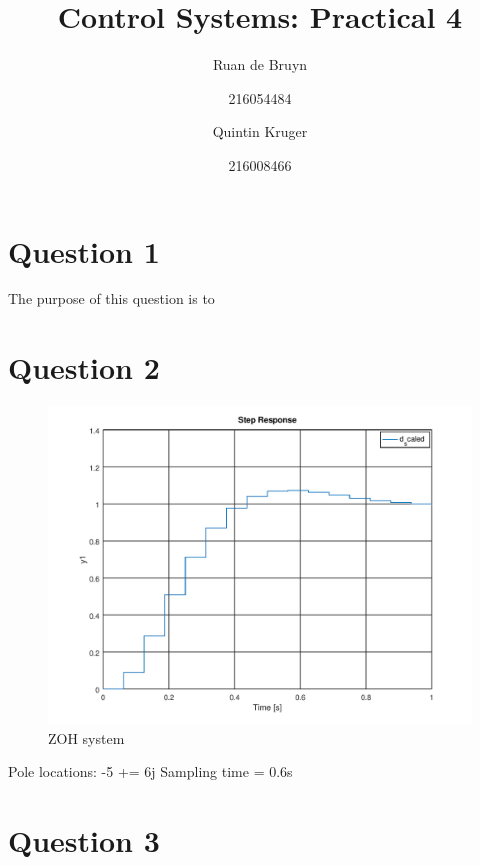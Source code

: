 \documentclass[a4paper, 12pt]{article}
\title{Control Systems: Practical 4}
\author{Ruan de Bruyn \and 216054484 \and Quintin Kruger \and 216008466}
\begin{document}
\maketitle
\newpage
{}
\tableofcontents
\listoffigures
\newpage
{}

\section{Question 1} %
\label{sec:question_1}
The purpose of this question is to 


\section{Question 2}

\begin{figure}[H]
	\centering
	\includegraphics{./img/2_1.png}
	\caption{ZOH system}
	\label{fig:2_1}
\end{figure}

Pole locations: -5 += 6j
Sampling time = 0.6s


\section{Question 3}

\end{document}
